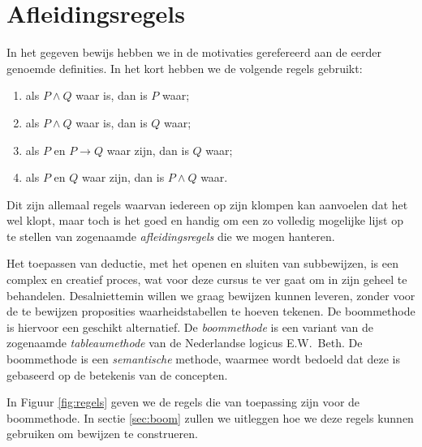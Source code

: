 \section{Afleidingsregels}
In het gegeven bewijs hebben we in de motivaties gerefereerd aan de eerder genoemde definities. In het kort hebben we de volgende regels gebruikt:
\begin{enumerate}
\item als $P\land Q$ waar is, dan is $P$ waar;
\item als $P\land Q$ waar is, dan is $Q$ waar;
\item als $P$ en $P\rightarrow Q$ waar zijn, dan is $Q$ waar;
\item als $P$ en $Q$ waar zijn, dan is $P\land Q$ waar.
\end{enumerate}
Dit zijn allemaal regels waarvan iedereen op zijn klompen kan aanvoelen dat het wel klopt, maar toch is het goed en handig om een zo volledig mogelijke lijst op te stellen van zogenaamde \textit{afleidingsregels} die we mogen hanteren. %

Het toepassen van deductie, met het openen en sluiten van subbewijzen, is een complex en creatief proces, wat voor deze cursus te ver gaat om in zijn geheel te behandelen. Desalniettemin willen we graag bewijzen kunnen leveren, zonder voor de te bewijzen proposities waarheidstabellen te hoeven tekenen. De boommethode is hiervoor een geschikt alternatief.
De \textit{boommethode} is een variant van de zogenaamde \textit{tableaumethode} van de Nederlandse logicus E.W.~Beth. De boommethode is een \textit{semantische} methode, waarmee wordt bedoeld dat deze is gebaseerd op de betekenis van de concepten.

In Figuur \ref{fig:regels} geven we de regels die van toepassing zijn voor de boommethode. In sectie \ref{sec:boom} zullen we uitleggen hoe we deze regels kunnen gebruiken om bewijzen te construeren.

